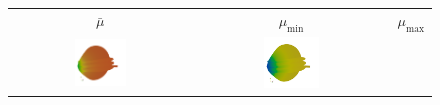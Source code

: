 \begin{figure}
    \centering
    \def\mysize{0.3\textwidth}
    \begin{tabular}{*{3}{c}}
        $\bar{\mu}$ & $\mu_{\text{min}}$ & $\mu_{\text{max}}$\\

        \includegraphics[width=\mysize]{fig/eye/results/toolbox/mubar-linear.png} &
        \includegraphics[width=\mysize]{fig/eye/results/toolbox/mumin-linear.png} &

\end{tabular}
\end{figure}
